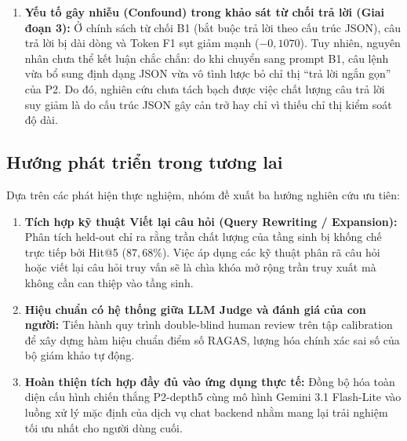 \begin{enumerate}
  \item \textbf{Yếu tố gây nhiễu (Confound) trong khảo sát từ chối trả lời (Giai đoạn 3):}
  Ở chính sách từ chối B1 (bắt buộc trả lời theo cấu trúc JSON), câu trả lời bị dài dòng và Token F1 sụt giảm mạnh ($-0{,}1070$). Tuy nhiên, nguyên nhân chưa thể kết luận chắc chắn: do khi chuyển sang prompt B1, câu lệnh vừa bổ sung định dạng JSON vừa vô tình lược bỏ chỉ thị ``trả lời ngắn gọn'' của P2. Do đó, nghiên cứu chưa tách bạch được việc chất lượng câu trả lời suy giảm là do cấu trúc JSON gây cản trở hay chỉ vì thiếu chỉ thị kiểm soát độ dài.
\end{enumerate}

\subsection{Hướng phát triển trong tương lai}

Dựa trên các phát hiện thực nghiệm, nhóm đề xuất ba hướng nghiên cứu ưu tiên:
\begin{enumerate}
  \item \textbf{Tích hợp kỹ thuật Viết lại câu hỏi (Query Rewriting / Expansion):} Phân tích held-out chỉ ra rằng trần chất lượng của tầng sinh bị khống chế trực tiếp bởi Hit@5 ($87{,}68\%$). Việc áp dụng các kỹ thuật phân rã câu hỏi hoặc viết lại câu hỏi truy vấn sẽ là chìa khóa mở rộng trần truy xuất mà không cần can thiệp vào tầng sinh.
  \item \textbf{Hiệu chuẩn có hệ thống giữa LLM Judge và đánh giá của con người:} Tiến hành quy trình double-blind human review trên tập calibration để xây dựng hàm hiệu chuẩn điểm số RAGAS, lượng hóa chính xác sai số của bộ giám khảo tự động.
  \item \textbf{Hoàn thiện tích hợp đầy đủ vào ứng dụng thực tế:} Đồng bộ hóa toàn diện cấu hình chiến thắng P2-depth5 cùng mô hình Gemini 3.1 Flash-Lite vào luồng xử lý mặc định của dịch vụ chat backend nhằm mang lại trải nghiệm tối ưu nhất cho người dùng cuối.
\end{enumerate}

